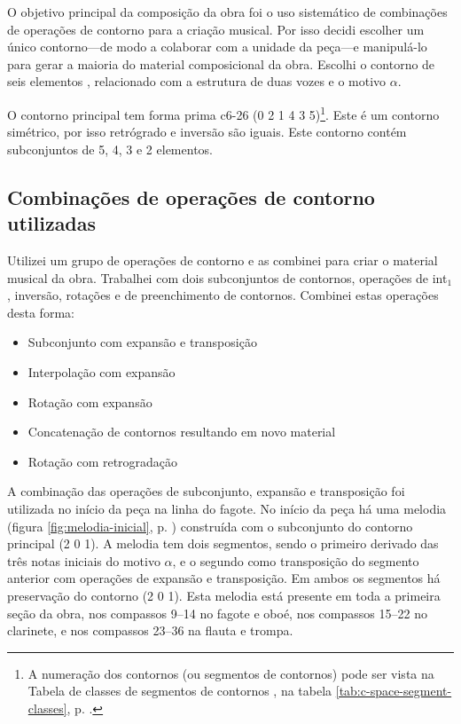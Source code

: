 O objetivo principal da composição da obra \obra{} foi o uso
sistemático de combinações de operações de contorno para a criação
musical. Por isso decidi escolher um único contorno---de modo a
colaborar com a unidade da peça---e manipulá-lo para gerar a maioria
do material composicional da obra. Escolhi o contorno de seis
elementos \contpr{}, relacionado com a estrutura de duas vozes e o
motivo $\alpha$.

O contorno principal \contpr{} tem forma prima c6-26 (0 2 1 4 3
5)\footnote{A numeração dos contornos (ou segmentos de contornos) pode
  ser vista na Tabela de classes de segmentos de contornos
  \cite{marvin.ea87:relating}, na tabela
  \ref{tab:c-space-segment-classes},
  p. \pageref{tab:c-space-segment-classes}.}. Este é um contorno
simétrico, por isso retrógrado e inversão são iguais. Este contorno
contém subconjuntos de 5, 4, 3 e 2 elementos.

\subsection{Combinações de operações de contorno utilizadas}
\label{sec:comb-de-oper}

Utilizei um grupo de operações de contorno e as combinei para criar o
material musical da obra. Trabalhei com dois subconjuntos de
contornos, operações de int$_1$, inversão, rotações e de preenchimento
de contornos. Combinei estas operações desta forma:

\begin{itemize}
\item Subconjunto com expansão e transposição
\item Interpolação com expansão
\item Rotação com expansão
\item Concatenação de contornos resultando em novo material
\item Rotação com retrogradação
\end{itemize}




A combinação das operações de subconjunto, expansão e transposição foi
utilizada no início da peça na linha do fagote. No início da peça há
uma melodia (figura \ref{fig:melodia-inicial},
p. \pageref{fig:melodia-inicial}) construída com o subconjunto do
contorno principal (2 0 1). A melodia tem dois segmentos, sendo o
primeiro derivado das três notas iniciais do motivo $\alpha$, e o
segundo como transposição do segmento anterior com operações de
expansão e transposição. Em ambos os segmentos há preservação do
contorno (2 0 1). Esta melodia está presente em toda a primeira seção
da obra, nos compassos 9--14 no fagote e oboé, nos compassos 15--22 no
clarinete, e nos compassos 23--36 na flauta e trompa.


